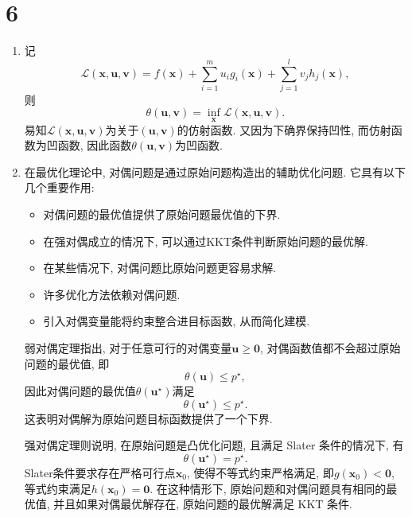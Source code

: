 \section*{6}

\begin{enumerate}[label=\alph*)]
    \item
        记
        \begin{equation*}
            \mathcal{L}(\bm{x},\bm{u},\bm{v})=f(\bm{x})+\sum_{i=1}^mu_ig_i(\bm{x})+\sum_{j=1}^lv_jh_j(\bm{x}),
        \end{equation*}
        则
        \begin{equation*}
            \theta(\bm{u},\bm{v})=\inf_{\bm{x}}\mathcal{L}(\bm{x},\bm{u},\bm{v}).
        \end{equation*}
        易知$\mathcal{L}(\bm{x},\bm{u},\bm{v})$为关于$(\bm{u},\bm{v})$的仿射函数.
        又因为下确界保持凹性, 而仿射函数为凹函数, 因此函数$\theta(\bm{u},\bm{v})$为凹函数.

    \item
    在最优化理论中, 对偶问题是通过原始问题构造出的辅助优化问题.
    它具有以下几个重要作用:
    \begin{itemize}
        \item 对偶问题的最优值提供了原始问题最优值的下界.
        \item 在强对偶成立的情况下, 可以通过KKT条件判断原始问题的最优解.
        \item 在某些情况下, 对偶问题比原始问题更容易求解.
        \item 许多优化方法依赖对偶问题.
        \item 引入对偶变量能将约束整合进目标函数, 从而简化建模.
    \end{itemize}

    弱对偶定理指出, 对于任意可行的对偶变量$\bm{u}\geq\bm{0}$, 对偶函数值都不会超过原始问题的最优值, 即
    \begin{equation*}
        \theta(\bm{u})\leq p^\star,
    \end{equation*}
    因此对偶问题的最优值$\theta(\bm{u}^\star)$满足
    \begin{equation*}
        \theta(\bm{u}^\star)\leq p^\star.
    \end{equation*}
    这表明对偶解为原始问题目标函数提供了一个下界.
    
    强对偶定理则说明, 在原始问题是凸优化问题, 且满足 Slater 条件的情况下, 有
    \begin{equation*}
        \theta(\bm{u}^\star)=p^\star.
    \end{equation*}
    Slater条件要求存在严格可行点$\bm{x}_0$, 使得不等式约束严格满足, 即$g(\bm{x}_0)<\bm{0}$, 等式约束满足$h(\bm{x}_0)=\bm{0}$.
    在这种情形下, 原始问题和对偶问题具有相同的最优值, 并且如果对偶最优解存在, 原始问题的最优解满足 KKT 条件.    
\end{enumerate}
